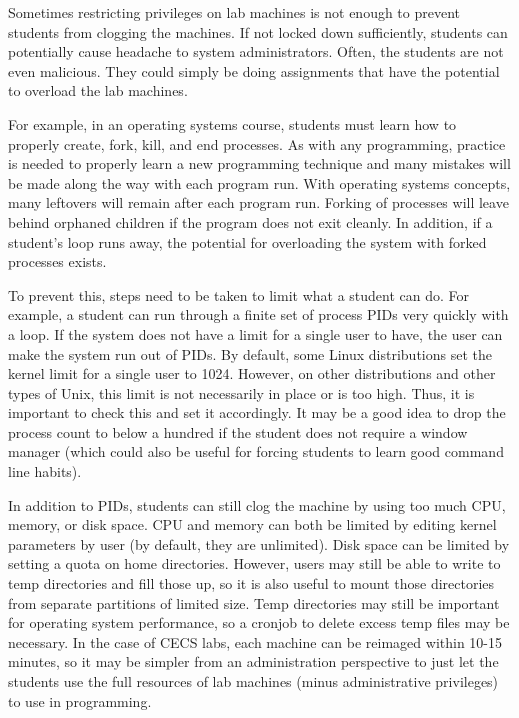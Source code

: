 Sometimes restricting privileges on lab machines is not enough to prevent students from clogging the machines.  If not locked down sufficiently, students can potentially cause headache to system administrators.  Often, the students are not even malicious.  They could simply be doing assignments that have the potential to overload the lab machines.

For example, in an operating systems course, students must learn how to properly create, fork, kill, and end processes.  As with any programming, practice is needed to properly learn a new programming technique and many mistakes will be made along the way with each program run.  With operating systems concepts, many leftovers will remain after each program run.  Forking of processes will leave behind orphaned children if the program does not exit cleanly.  In addition, if a student's loop runs away, the potential for overloading the system with forked processes exists.  

To prevent this, steps need to be taken to limit what a student can do.  For example, a student can run through a finite set of process PIDs very quickly with a loop.  If the system does not have a limit for a single user to have, the user can make the system run out of PIDs.  By default, some Linux distributions set the kernel limit for a single user to 1024.  However, on other distributions and other types of Unix, this limit is not necessarily in place or is too high.  Thus, it is important to check this and set it accordingly.  It may be a good idea to drop the process count to below a hundred if the student does not require a window manager (which could also be useful for forcing students to learn good command line habits).  

In addition to PIDs, students can still clog the machine by using too much CPU, memory, or disk space.  CPU and memory can both be limited by editing kernel parameters by user (by default, they are unlimited).  Disk space can be limited by setting a quota on home directories.  However, users may still be able to write to temp directories and fill those up, so it is also useful to mount those directories from separate partitions of limited size.  Temp directories may still be important for operating system performance, so a cronjob to delete excess temp files may be necessary.  In the case of CECS labs, each machine can be reimaged within 10-15 minutes, so it may be simpler from an administration perspective to just let the students use the full resources of lab machines (minus administrative privileges) to use in programming.  


